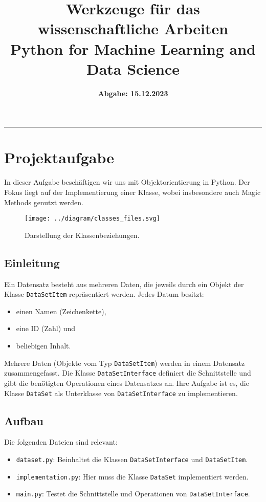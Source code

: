 \documentclass[a4paper,12pt]{article}
\begin{document}
\title{\textbf{Werkzeuge für das wissenschaftliche Arbeiten}\\
Python for Machine Learning and Data Science}
\date{\textbf{Abgabe: 15.12.2023}}
\maketitle
\hrule\vspace{0.5cm}

\tableofcontents
\newpage

\section{Projektaufgabe}

In dieser Aufgabe beschäftigen wir uns mit Objektorientierung in Python. Der Fokus liegt auf der Implementierung einer Klasse, wobei insbesondere auch Magic Methods genutzt werden.

\begin{figure}[h!]
    \centering
    \texttt{[image: ../diagram/classes\_files.svg]}
    \caption{Darstellung der Klassenbeziehungen.}
    \label{fig:classes}
\end{figure}

\subsection{Einleitung}
Ein Datensatz besteht aus mehreren Daten, die jeweils durch ein Objekt der Klasse \texttt{DataSetItem} repräsentiert werden. Jedes Datum besitzt:
\begin{itemize}
    \item einen Namen (Zeichenkette),
    \item eine ID (Zahl) und
    \item beliebigen Inhalt.
\end{itemize}

Mehrere Daten (Objekte vom Typ \texttt{DataSetItem}) werden in einem Datensatz zusammengefasst. Die Klasse \texttt{DataSetInterface} definiert die Schnittstelle und gibt die benötigten Operationen eines Datensatzes an. Ihre Aufgabe ist es, die Klasse \texttt{DataSet} als Unterklasse von \texttt{DataSetInterface} zu implementieren.

\subsection{Aufbau}
Die folgenden Dateien sind relevant:
\begin{itemize}
    \item \texttt{dataset.py}: Beinhaltet die Klassen \texttt{DataSetInterface} und \texttt{DataSetItem}.
    \item \texttt{implementation.py}: Hier muss die Klasse \texttt{DataSet} implementiert werden.
    \item \texttt{main.py}: Testet die Schnittstelle und Operationen von \texttt{DataSetInterface}.
\end{itemize}
\end{document}
